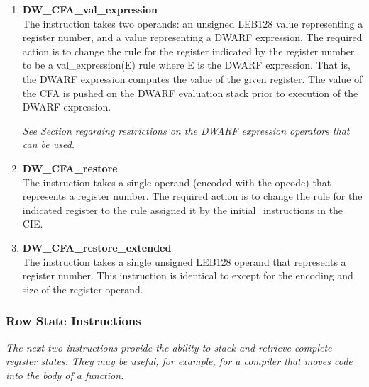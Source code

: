 \begin{enumerate}[1. ]
\item \textbf{DW\-\_CFA\-\_val\-\_expression} \\
The  instruction takes two operands:
an unsigned LEB128 
value representing a register number, and
a  
value representing a DWARF expression. The
required action is to change the rule for the register
indicated by the register number to be a val\_expression(E)
rule where E is the DWARF expression. That is, the DWARF
expression computes the value of the given register. The value
of the CFA is pushed on the DWARF evaluation stack prior to
execution of the DWARF expression.

\textit{See Section  
regarding restrictions on the DWARF
expression operators that can be used.}

\item \textbf{ DW\-\_CFA\-\_restore} \\
The  instruction takes a single operand (encoded
with the opcode) that represents a register number. The
required action is to change the rule for the indicated
register to the rule assigned it by the initial\_instructions
in the CIE.

\item \textbf{DW\-\_CFA\-\_restore\-\_extended} \\
The 
instruction takes a single unsigned LEB128 
operand that represents a register number. This
instruction is identical to  except for the
encoding and size of the register operand.

\end{enumerate}

\subsubsection{Row State Instructions}
\label{chap:rowstateinstructions}

\textit{The next two instructions provide the ability to stack and
retrieve complete register states. They may be useful, for
example, for a compiler that moves  code 
into the
body of a function.}


